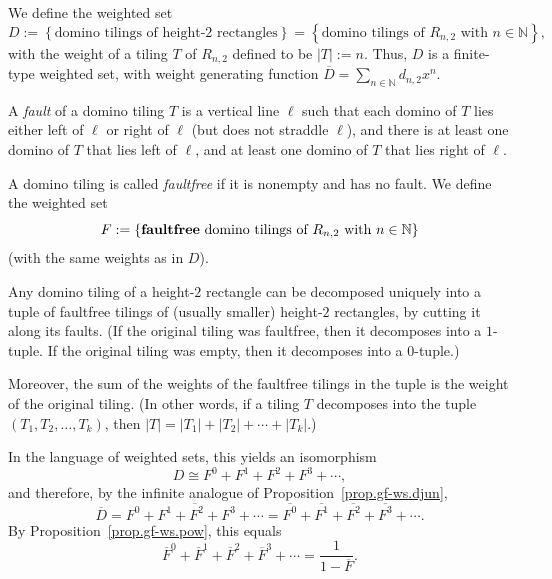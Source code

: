 We define the weighted set
\[
D := \left\{  \text{domino tilings of height-}2\text{ rectangles}\right\}
= \left\{  \text{domino tilings of }R_{n,2}\text{ with }n\in
\mathbb{N}\right\}  ,
\]
with the weight of a tiling $T$ of $R_{n,2}$ defined to be $\left\vert
T\right\vert := n$. Thus, $D$ is a finite-type weighted set, with weight
generating function $\overline{D}=\sum_{n\in\mathbb{N}}d_{n,2}x^{n}$.

A \emph{fault} of a domino tiling $T$ is a vertical line $\ell$ such that
each domino of $T$ lies either left of $\ell$ or right of $\ell$ (but
does not straddle $\ell$), and
there is at least one domino of $T$ that lies left of $\ell$, and at
least one domino of $T$ that lies right of $\ell$.

A domino tiling is called \emph{faultfree} if it is nonempty and has no
fault. We define the weighted set
\[
F:=\left\{  \text{\textbf{faultfree} domino tilings of }R_{n,2}\text{ with
}n\in\mathbb{N}\right\}
\]
(with the same weights as in $D$).

\begin{lemma}
\label{lem.gf.weighted-set.domino.fd}
\leantarget
\leanok
Any domino tiling of a height-$2$
rectangle can be decomposed uniquely into a tuple of faultfree tilings of
(usually smaller) height-$2$ rectangles, by cutting it along its faults.
(If the original tiling was faultfree, then it decomposes into a
$1$-tuple. If the original tiling was empty, then it decomposes into a $0$-tuple.)

Moreover, the sum of the weights of the faultfree tilings in the tuple is the
weight of the original tiling. (In other words, if a tiling $T$ decomposes
into the tuple $\left(  T_{1},T_{2},\ldots,T_{k}\right)  $, then $\left\vert
T\right\vert =\left\vert T_{1}\right\vert +\left\vert T_{2}\right\vert
+\cdots+\left\vert T_{k}\right\vert $.)

In the language of weighted sets, this yields an isomorphism
\[
D\cong F^{0}+F^{1}+F^{2}+F^{3}+\cdots,
\]
and therefore, by the infinite analogue of Proposition~\ref{prop.gf-ws.djun},
\[
\overline{D}  =\overline{F^{0}+F^{1}+F^{2}+F^{3}+\cdots}=\overline{F^{0}%
}+\overline{F^{1}}+\overline{F^{2}}+\overline{F^{3}}+\cdots.
\]
By Proposition~\ref{prop.gf-ws.pow}, this equals
\[
\overline{F}^{0}+\overline{F}^{1}+\overline{F}^{2}+\overline{F}^{3}%
+\cdots=\dfrac{1}{1-\overline{F}}.
\]
\end{lemma}

